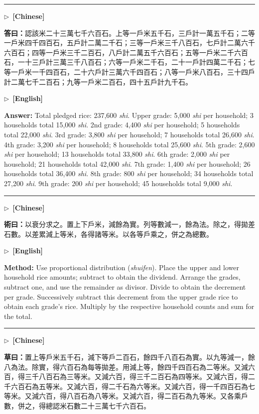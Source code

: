 \documentclass[10pt,a4paper]{article}
\newcommand{\longline}{\par\noindent\rule{\textwidth}{0.4pt}\par}
\newcommand{\CNmarker}{\noindent\textcolor{cnlabel}{$\triangleright$\ \textbf{[Chinese]}}\par}
\newcommand{\ENmarker}{\noindent\textcolor{enlabel}{$\triangleright$\ \textbf{[English]}}\par}
\newcommand{\Answer}[1]{\par\noindent\textbf{\color{answercolor}答曰：}#1\par}
\newcommand{\Method}[1]{\par\noindent\textbf{\color{methodcolor}術曰：}#1\par}
\newcommand{\Working}[1]{\par\noindent\textbf{\color{workingcolor}草曰：}#1\par}
\newcommand{\AnswerEn}[1]{\par\noindent\textbf{\color{answercolor}Answer:} #1\par}
\newcommand{\MethodEn}[1]{\par\noindent\textbf{\color{methodcolor}Method:} #1\par}
\begin{document}
\longline

\CNmarker
\Answer{認該米二十三萬七千六百石。上等一戶米五千石，三戶計一萬五千石；二等一戶米四千四百石，五戶計二萬二千石；三等一戶米三千八百石，七戶計二萬六千六百石；四等一戶米三千二百石，八戶計二萬五千六百石；五等一戶米二千六百石，一十三戶計三萬三千八百石；六等一戶米二千石，二十一戶計四萬二千石；七等一戶米一千四百石，二十六戶計三萬六千四百石；八等一戶米八百石，三十四戶計二萬七千二百石；九等一戶米二百石，四十五戶計九千石。}

\ENmarker
\AnswerEn{Total pledged rice: 237,600 \textit{shi}. Upper grade: 5,000 \textit{shi} per household; 3 households total 15,000 \textit{shi}. 2nd grade: 4,400 \textit{shi} per household; 5 households total 22,000 \textit{shi}. 3rd grade: 3,800 \textit{shi} per household; 7 households total 26,600 \textit{shi}. 4th grade: 3,200 \textit{shi} per household; 8 households total 25,600 \textit{shi}. 5th grade: 2,600 \textit{shi} per household; 13 households total 33,800 \textit{shi}. 6th grade: 2,000 \textit{shi} per household; 21 households total 42,000 \textit{shi}. 7th grade: 1,400 \textit{shi} per household; 26 households total 36,400 \textit{shi}. 8th grade: 800 \textit{shi} per household; 34 households total 27,200 \textit{shi}. 9th grade: 200 \textit{shi} per household; 45 households total 9,000 \textit{shi}.}

\longline

\CNmarker
\Method{以衰分求之。置上下戶米，減餘為實。列等數減一，餘為法。除之，得拋差石數。以差累減上等米，各得諸等米。以各等戶乘之，併之為總數。}

\ENmarker
\MethodEn{Use proportional distribution (\textit{shuifen}). Place the upper and lower household rice amounts; subtract to obtain the dividend. Arrange the grades, subtract one, and use the remainder as divisor. Divide to obtain the decrement per grade. Successively subtract this decrement from the upper grade rice to obtain each grade's rice. Multiply by the respective household counts and sum for the total.}

\longline

\CNmarker
\Working{置上等戶米五千石，減下等戶二百石，餘四千八百石為實。以九等減一，餘八為法。除實，得六百石為每等拋差。用減上等，餘四千四百石為二等米。又減六百，得三千八百石為三等米。又減六百，得三千二百石為四等米。又減六百，得二千六百石為五等米。又減六百，得二千石為六等米。又減六百，得一千四百石為七等米。又減六百，得八百石為八等米。又減六百，得二百石為九等米。又各乘戶數，併之，得總認米石數二十三萬七千六百石。}
\end{document}
